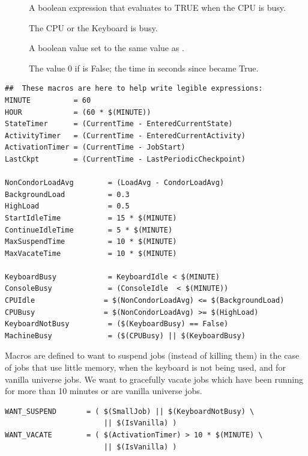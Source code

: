 \begin{description}
\item[] A boolean expression that evaluates
    to TRUE when the CPU is busy.

\item[] The CPU or the Keyboard is busy.

\item[] A boolean value set to the same value as 
    .

\item[] The value 0 if 
    is False; the time in seconds since
     became True.
    
\end{description}

\begin{verbatim}
##  These macros are here to help write legible expressions:
MINUTE          = 60
HOUR            = (60 * $(MINUTE))
StateTimer      = (CurrentTime - EnteredCurrentState)
ActivityTimer   = (CurrentTime - EnteredCurrentActivity)
ActivationTimer = (CurrentTime - JobStart)
LastCkpt        = (CurrentTime - LastPeriodicCheckpoint)

NonCondorLoadAvg        = (LoadAvg - CondorLoadAvg)
BackgroundLoad          = 0.3
HighLoad                = 0.5
StartIdleTime           = 15 * $(MINUTE)
ContinueIdleTime        = 5 * $(MINUTE)
MaxSuspendTime          = 10 * $(MINUTE)
MaxVacateTime           = 10 * $(MINUTE)

KeyboardBusy            = KeyboardIdle < $(MINUTE)
ConsoleBusy             = (ConsoleIdle  < $(MINUTE))
CPUIdle                = $(NonCondorLoadAvg) <= $(BackgroundLoad)
CPUBusy                = $(NonCondorLoadAvg) >= $(HighLoad)
KeyboardNotBusy         = ($(KeyboardBusy) == False)
MachineBusy             = ($(CPUBusy) || $(KeyboardBusy)
\end{verbatim}

Macros are defined to want to suspend jobs (instead of
killing them) in the case of jobs that use little memory,
when the keyboard is not being used, and for vanilla universe
jobs.
We want to gracefully vacate jobs which
have been running for more than 10 minutes
or are vanilla universe jobs.
\begin{verbatim}
WANT_SUSPEND       = ( $(SmallJob) || $(KeyboardNotBusy) \
                       || $(IsVanilla) )
WANT_VACATE        = ( $(ActivationTimer) > 10 * $(MINUTE) \
                       || $(IsVanilla) )
\end{verbatim}

